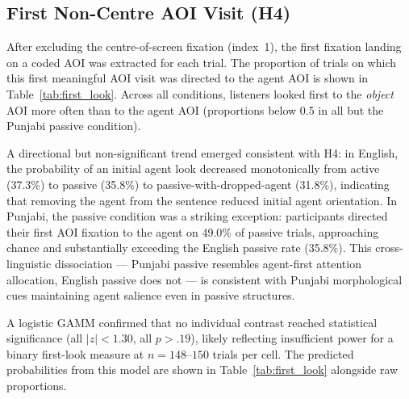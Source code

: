 \documentclass[12pt, a4paper]{article}
\begin{document}
\subsection{First Non-Centre AOI Visit (H4)}

After excluding the centre-of-screen fixation (index~1), the first fixation
landing on a coded AOI was extracted for each trial.
The proportion of trials on which this first meaningful AOI visit was directed
to the agent AOI is shown in Table~\ref{tab:first_look}.
Across all conditions, listeners looked first to the \emph{object} AOI more
often than to the agent AOI (proportions below 0.5 in all but the Punjabi passive condition).

A directional but non-significant trend emerged consistent with H4:
in English, the probability of an initial agent look decreased monotonically
from active (37.3\%) to passive (35.8\%) to passive-with-dropped-agent (31.8\%),
indicating that removing the agent from the sentence reduced initial agent
orientation.
In Punjabi, the passive condition was a striking exception:
participants directed their first AOI fixation to the agent on 49.0\% of
passive trials, approaching chance and substantially exceeding the English
passive rate (35.8\%).
This cross-linguistic dissociation --- Punjabi passive resembles agent-first
attention allocation, English passive does not --- is consistent with
Punjabi morphological cues maintaining agent salience even in passive structures.

A logistic GAMM confirmed that no individual contrast reached statistical
significance (all $|z| < 1.30$, all $p > .19$), likely reflecting
insufficient power for a binary first-look measure at $n = 148$--$150$ trials
per cell.
The predicted probabilities from this model are shown in Table~\ref{tab:first_look}
alongside raw proportions.
\end{document}

